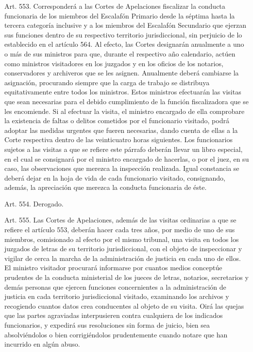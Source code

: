     Art. 553. Corresponderá a las Cortes de Apelaciones fiscalizar la conducta funcionaria de los miembros del Escalafón Primario desde la séptima hasta la tercera categoría inclusive y a los miembros del Escalafón Secundario que ejerzan sus funciones dentro de su respectivo territorio jurisdiccional, sin perjuicio de lo establecido en el artículo 564. Al efecto, las Cortes designarán anualmente a uno o más de sus ministros para que, durante el respectivo año calendario, actúen como ministros visitadores en los juzgados y en los oficios de los notarios, conservadores y archiveros que se les asignen. Anualmente deberá cambiarse la asignación, procurando siempre que la carga de trabajo se distribuya equitativamente entre todos los ministros.
    Estos ministros efectuarán las visitas que sean necesarias para el debido cumplimiento de la función fiscalizadora que se les encomiende.
    Si al efectuar la visita, el ministro encargado de ella comprobare la existencia de faltas o delitos cometidos por el funcionario visitado, podrá adoptar las medidas urgentes que fueren necesarias, dando cuenta de ellas a la Corte respectiva dentro de las veinticuatro horas siguientes.
    Los funcionarios sujetos a las visitas a que se refiere este párrafo deberán llevar un libro especial, en el cual se consignará por el ministro encargado de hacerlas, o por el juez, en su caso, las observaciones que merezca la inspección realizada. Igual constancia se deberá dejar en la hoja de vida de cada funcionario visitado, consignando, además, la apreciación que merezca la conducta funcionaria de éste.


    Art. 554. Derogado.



    Art. 555. Las Cortes de Apelaciones, además de las visitas ordinarias a que se refiere el artículo 553, deberán hacer cada tres años, por medio de uno de sus miembros, comisionado al efecto por el mismo tribunal, una visita en todos los juzgados de letras de su territorio jurisdiccional, con el objeto de inspeccionar y vigilar de cerca la marcha de la administración de justicia en cada uno de ellos.
    El ministro visitador procurará informarse por cuantos medios conceptúe prudentes de la conducta ministerial de los jueces de letras, notarios, secretarios y demás personas que ejercen funciones concernientes a la administración de justicia en cada territorio jurisdiccional visitado, examinando los archivos y recogiendo cuantos datos crea conducentes al objeto de su visita.
    Oirá las quejas que las partes agraviadas interpusieren contra cualquiera de los indicados funcionarios, y expedirá sus resoluciones sin forma de juicio, bien sea absolviéndolos o bien corrigiéndolos prudentemente cuando notare que han incurrido en algún abuso.



